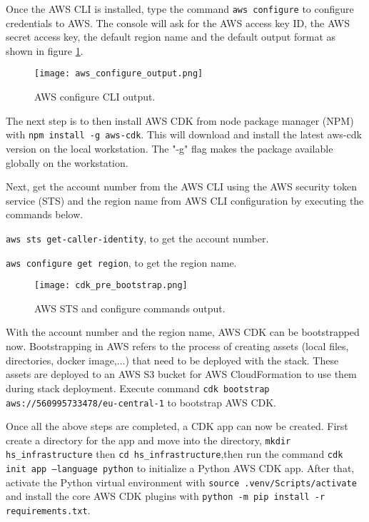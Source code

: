 Once the AWS CLI is installed, type the command \texttt{aws configure} to configure credentials to AWS. The console will ask for the AWS access key ID, the AWS secret access key, the default region name and the default output format as shown in figure \ref{fig:aws-configure-output}.

\begin{figure}[H]
    \centering \texttt{[image: aws\_configure\_output.png]}
    \caption{AWS configure CLI output.}
    \label{fig:aws-configure-output}
\end{figure}

The next step is to then install AWS CDK from node package manager (NPM) with \texttt{npm install -g aws-cdk}. This will download and install the latest aws-cdk version on the local workstation. The "-g" flag makes the package available globally on the workstation.

Next, get the account number from the AWS CLI using the AWS security token service (STS) and the region name from AWS CLI configuration by executing the commands below.

\texttt{aws sts get-caller-identity}, to get the account number.

\texttt{aws configure get region}, to get the region name.

\begin{figure}[H]
    \centering \texttt{[image: cdk\_pre\_bootstrap.png]}
    \caption{AWS STS and configure commands output.}
    \label{fig:aws-account-numbre-region}
\end{figure}

With the account number and the region name, AWS CDK can be bootstrapped now. Bootstrapping in AWS refers to the process of creating assets (local files, directories, docker image,...) that need to be deployed with the stack. These assets are deployed to an AWS S3 bucket for AWS CloudFormation to use them during stack deployment. Execute command \texttt{cdk bootstrap aws://560995733478/eu-central-1} to bootstrap AWS CDK.

Once all the above steps are completed, a CDK app can now be created. First create a directory for the app and move into the directory, \texttt{mkdir hs_infrastructure} then \texttt{cd hs_infrastructure},then run the command \texttt{cdk init app --language python} to initialize a Python AWS CDK app. After that, activate the Python virtual environment with \texttt{source .venv/Scripts/activate} and install the core AWS CDK plugins with \texttt{python -m pip install -r requirements.txt}.


